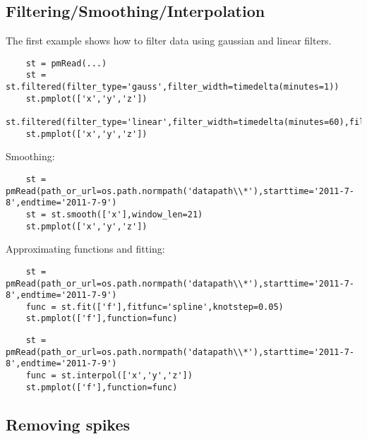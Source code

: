 \subsection{Filtering/Smoothing/Interpolation}

The first example shows how to filter data using gaussian and linear filters.
\begin{verbatim}
    st = pmRead(...)
    st = st.filtered(filter_type='gauss',filter_width=timedelta(minutes=1))
    st.pmplot(['x','y','z'])
    st.filtered(filter_type='linear',filter_width=timedelta(minutes=60),filter_offset=timedelta(minutes=30))
    st.pmplot(['x','y','z'])
\end{verbatim}

Smoothing:
\begin{verbatim}
    st = pmRead(path_or_url=os.path.normpath('datapath\\*'),starttime='2011-7-8',endtime='2011-7-9')
    st = st.smooth(['x'],window_len=21)
    st.pmplot(['x','y','z'])
\end{verbatim}

Approximating functions and fitting:
\begin{verbatim}
    st = pmRead(path_or_url=os.path.normpath('datapath\\*'),starttime='2011-7-8',endtime='2011-7-9')
    func = st.fit(['f'],fitfunc='spline',knotstep=0.05)
    st.pmplot(['f'],function=func)
\end{verbatim}

\begin{verbatim}
    st = pmRead(path_or_url=os.path.normpath('datapath\\*'),starttime='2011-7-8',endtime='2011-7-9')
    func = st.interpol(['x','y','z'])
    st.pmplot(['f'],function=func)
\end{verbatim}

\subsection{Removing spikes}

